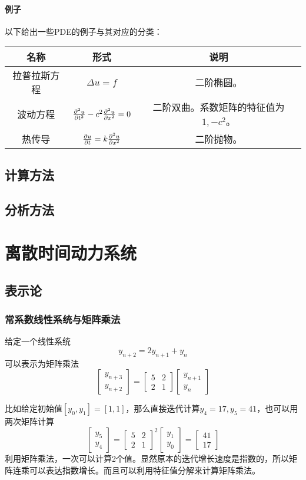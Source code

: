 \paragraph*{例子}以下给出一些PDE的例子与其对应的分类：
\begin{longtable}{ccc}
\toprule
名称 & 形式 & 说明\\
\midrule
拉普拉斯方程& $\Delta u=f$ & 二阶椭圆。\\
波动方程& $\pdv[order=2]{u}{t}-c^2\pdv[order=2]{u}{x}=0$ &二阶双曲。系数矩阵的特征值为$1,-c^2$。\\
热传导& $\pdv{u}{t}=k\pdv[order=2]{u}{x}$& 二阶抛物。\\
\bottomrule
\end{longtable}

\subsection{计算方法}


\subsection{分析方法}


\section{离散时间动力系统}
\subsection{表示论}
\subsubsection{常系数线性系统与矩阵乘法}
给定一个线性系统
$$y_{n+2}=2y_{n+1}+y_{n}$$
可以表示为矩阵乘法
\[
\begin{bmatrix}
y_{n+3}\\
y_{n+2}
\end{bmatrix}=\begin{bmatrix}
5 & 2\\
2 & 1
\end{bmatrix}\begin{bmatrix}
y_{n+1}\\
y_{n}
\end{bmatrix}\]

比如给定初始值$[y_0,y_1]=[1,1]$，那么直接迭代计算$y_4=17,y_5=41$，也可以用两次矩阵计算
\[\begin{bmatrix}
	y_{5}\\
	y_{4}
\end{bmatrix}=\begin{bmatrix}
	5 & 2\\
	2 & 1
\end{bmatrix}^2\begin{bmatrix}
	y_{1}\\
	y_{0}
\end{bmatrix}=\begin{bmatrix}
41\\17
\end{bmatrix}\]
利用矩阵乘法，一次可以计算2个值。显然原本的迭代增长速度是指数的，所以矩阵连乘可以表达指数增长。而且可以利用特征值分解来计算矩阵乘法。


